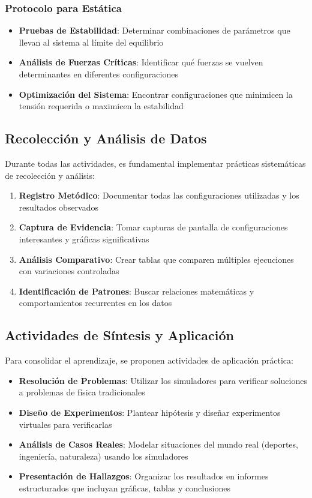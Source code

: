 \subsubsection{Protocolo para Estática}
\begin{itemize}
    \item \textbf{Pruebas de Estabilidad}: Determinar combinaciones de parámetros que llevan al sistema al límite del equilibrio
    \item \textbf{Análisis de Fuerzas Críticas}: Identificar qué fuerzas se vuelven determinantes en diferentes configuraciones
    \item \textbf{Optimización del Sistema}: Encontrar configuraciones que minimicen la tensión requerida o maximicen la estabilidad
\end{itemize}

\subsection{Recolección y Análisis de Datos}

Durante todas las actividades, es fundamental implementar prácticas sistemáticas de recolección y análisis:

\begin{enumerate}
    \item \textbf{Registro Metódico}: Documentar todas las configuraciones utilizadas y los resultados observados
    \item \textbf{Captura de Evidencia}: Tomar capturas de pantalla de configuraciones interesantes y gráficas significativas
    \item \textbf{Análisis Comparativo}: Crear tablas que comparen múltiples ejecuciones con variaciones controladas
    \item \textbf{Identificación de Patrones}: Buscar relaciones matemáticas y comportamientos recurrentes en los datos
\end{enumerate}

\subsection{Actividades de Síntesis y Aplicación}

Para consolidar el aprendizaje, se proponen actividades de aplicación práctica:

\begin{itemize}
    \item \textbf{Resolución de Problemas}: Utilizar los simuladores para verificar soluciones a problemas de física tradicionales
    \item \textbf{Diseño de Experimentos}: Plantear hipótesis y diseñar experimentos virtuales para verificarlas
    \item \textbf{Análisis de Casos Reales}: Modelar situaciones del mundo real (deportes, ingeniería, naturaleza) usando los simuladores
    \item \textbf{Presentación de Hallazgos}: Organizar los resultados en informes estructurados que incluyan gráficas, tablas y conclusiones
\end{itemize}

